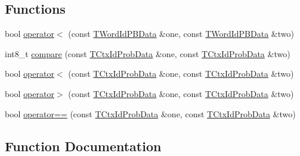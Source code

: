 \subsection*{Functions}
\begin{DoxyCompactItemize}
\item 
bool \hyperlink{namespaceuva_1_1smt_1_1tries_1_1_____c2_w_array_trie_a75a68f7185e2a16810afeee39537667e}{operator$<$} (const \hyperlink{structuva_1_1smt_1_1tries_1_1_____c2_w_array_trie_1_1_t_word_id_p_b_data}{T\+Word\+Id\+P\+B\+Data} \&one, const \hyperlink{structuva_1_1smt_1_1tries_1_1_____c2_w_array_trie_1_1_t_word_id_p_b_data}{T\+Word\+Id\+P\+B\+Data} \&two)
\item 
int8\+\_\+t \hyperlink{namespaceuva_1_1smt_1_1tries_1_1_____c2_w_array_trie_a78f873684d6d7d7502a37ff19ddad1aa}{compare} (const \hyperlink{structuva_1_1smt_1_1tries_1_1_____c2_w_array_trie_1_1_t_ctx_id_prob_data}{T\+Ctx\+Id\+Prob\+Data} \&one, const \hyperlink{structuva_1_1smt_1_1tries_1_1_____c2_w_array_trie_1_1_t_ctx_id_prob_data}{T\+Ctx\+Id\+Prob\+Data} \&two)
\item 
bool \hyperlink{namespaceuva_1_1smt_1_1tries_1_1_____c2_w_array_trie_a26cd57cdfbfaed7df7cfd40631af2f95}{operator$<$} (const \hyperlink{structuva_1_1smt_1_1tries_1_1_____c2_w_array_trie_1_1_t_ctx_id_prob_data}{T\+Ctx\+Id\+Prob\+Data} \&one, const \hyperlink{structuva_1_1smt_1_1tries_1_1_____c2_w_array_trie_1_1_t_ctx_id_prob_data}{T\+Ctx\+Id\+Prob\+Data} \&two)
\item 
bool \hyperlink{namespaceuva_1_1smt_1_1tries_1_1_____c2_w_array_trie_aa04b1ce1d185a70e2fc0e958aa3190bf}{operator$>$} (const \hyperlink{structuva_1_1smt_1_1tries_1_1_____c2_w_array_trie_1_1_t_ctx_id_prob_data}{T\+Ctx\+Id\+Prob\+Data} \&one, const \hyperlink{structuva_1_1smt_1_1tries_1_1_____c2_w_array_trie_1_1_t_ctx_id_prob_data}{T\+Ctx\+Id\+Prob\+Data} \&two)
\item 
bool \hyperlink{namespaceuva_1_1smt_1_1tries_1_1_____c2_w_array_trie_ae4ade93ace639c89fb9c608f7c0f4dcd}{operator==} (const \hyperlink{structuva_1_1smt_1_1tries_1_1_____c2_w_array_trie_1_1_t_ctx_id_prob_data}{T\+Ctx\+Id\+Prob\+Data} \&one, const \hyperlink{structuva_1_1smt_1_1tries_1_1_____c2_w_array_trie_1_1_t_ctx_id_prob_data}{T\+Ctx\+Id\+Prob\+Data} \&two)
\end{DoxyCompactItemize}


\subsection{Function Documentation}
\hypertarget{namespaceuva_1_1smt_1_1tries_1_1_____c2_w_array_trie_a78f873684d6d7d7502a37ff19ddad1aa}{}
